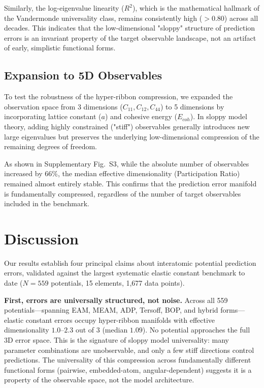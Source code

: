 \documentclass[twocolumn,10pt]{article}
\begin{document}
Similarly, the log-eigenvalue linearity ($R^2$), which is the mathematical hallmark of the Vandermonde universality class, remains consistently high ($>0.80$) across all decades. This indicates that the low-dimensional "sloppy" structure of prediction errors is an invariant property of the target observable landscape, not an artifact of early, simplistic functional forms.

\subsection{Expansion to 5D Observables}

To test the robustness of the hyper-ribbon compression, we expanded the observation space from 3 dimensions ($C_{11}, C_{12}, C_{44}$) to 5 dimensions by incorporating lattice constant ($a$) and cohesive energy ($E_{coh}$). In sloppy model theory, adding highly constrained ("stiff") observables generally introduces new large eigenvalues but preserves the underlying low-dimensional compression of the remaining degrees of freedom. 

As shown in Supplementary Fig.~S3, while the absolute number of observables increased by 66\%, the median effective dimensionality (Participation Ratio) remained almost entirely stable. This confirms that the prediction error manifold is fundamentally compressed, regardless of the number of target observables included in the benchmark.

\section{Discussion}

Our results establish four principal claims about interatomic potential prediction errors, validated against the largest systematic elastic constant benchmark to date ($N = 559$ potentials, 15 elements, 1,677 data points).

\textbf{First, errors are universally structured, not noise.} Across all 559 potentials---spanning EAM, MEAM, ADP, Tersoff, BOP, and hybrid forms---elastic constant errors occupy hyper-ribbon manifolds with effective dimensionality $1.0$--$2.3$ out of $3$ (median $1.09$). No potential approaches the full 3D error space. This is the signature of sloppy model universality: many parameter combinations are unobservable, and only a few stiff directions control predictions\cite{transtrum2011}. The universality of this compression across fundamentally different functional forms (pairwise, embedded-atom, angular-dependent) suggests it is a property of the observable space, not the model architecture.
\end{document}
